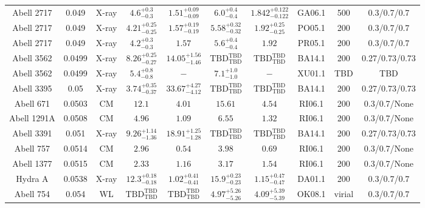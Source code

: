 \begin{table}
\begin{tabular}{cccccccccc}
Abell 2717 & 0.049 & X-ray & ${4.6}^{+0.3}_{-0.3}$ & ${1.51}^{+0.09}_{-0.09}$ & ${6.0}^{+0.4}_{-0.4}$ & ${1.842}^{+0.122}_{-0.122}$ & GA06.1 & 500 & 0.3/0.7/0.7 \\
Abell 2717 & 0.049 & X-ray & ${4.21}^{+0.25}_{-0.25}$ & ${1.57}^{+0.19}_{-0.19}$ & ${5.58}^{+0.32}_{-0.32}$ & ${1.92}^{+0.25}_{-0.25}$ & PO05.1 & 200 & 0.3/0.7/0.7 \\
Abell 2717 & 0.049 & X-ray & ${4.2}^{+0.3}_{-0.3}$ & ${1.57}^{}_{}$ & ${5.6}^{+0.4}_{-0.4}$ & ${1.92}^{}_{}$ & PR05.1 & 200 & 0.3/0.7/0.7 \\
Abell 3562 & 0.0499 & X-ray & ${8.26}^{+0.25}_{-0.27}$ & ${14.05}^{+1.56}_{-1.46}$ & ${\mathrm{TBD}}^{\mathrm{TBD}}_{\mathrm{TBD}}$ & ${\mathrm{TBD}}^{\mathrm{TBD}}_{\mathrm{TBD}}$ & BA14.1 & 200 & 0.27/0.73/0.73 \\
Abell 3562 & 0.0499 & X-ray & ${5.4}^{+0.8}_{-0.8}$ & ${-}^{}_{}$ & ${7.1}^{+1.0}_{-1.0}$ & ${-}^{}_{}$ & XU01.1 & TBD & TBD \\
Abell 3395 & 0.05 & X-ray & ${3.74}^{+0.35}_{-0.37}$ & ${33.67}^{+4.27}_{-4.12}$ & ${\mathrm{TBD}}^{\mathrm{TBD}}_{\mathrm{TBD}}$ & ${\mathrm{TBD}}^{\mathrm{TBD}}_{\mathrm{TBD}}$ & BA14.1 & 200 & 0.27/0.73/0.73 \\
Abell 671 & 0.0503 & CM & ${12.1}^{}_{}$ & ${4.01}^{}_{}$ & ${15.61}^{}_{}$ & ${4.54}^{}_{}$ & RI06.1 & 200 & 0.3/0.7/None \\
Abell 1291A & 0.0508 & CM & ${4.96}^{}_{}$ & ${1.09}^{}_{}$ & ${6.55}^{}_{}$ & ${1.32}^{}_{}$ & RI06.1 & 200 & 0.3/0.7/None \\
Abell 3391 & 0.051 & X-ray & ${9.26}^{+1.14}_{-1.36}$ & ${18.91}^{+1.25}_{-1.28}$ & ${\mathrm{TBD}}^{\mathrm{TBD}}_{\mathrm{TBD}}$ & ${\mathrm{TBD}}^{\mathrm{TBD}}_{\mathrm{TBD}}$ & BA14.1 & 200 & 0.27/0.73/0.73 \\
Abell 757 & 0.0514 & CM & ${2.96}^{}_{}$ & ${0.54}^{}_{}$ & ${3.98}^{}_{}$ & ${0.69}^{}_{}$ & RI06.1 & 200 & 0.3/0.7/None \\
Abell 1377 & 0.0515 & CM & ${2.33}^{}_{}$ & ${1.16}^{}_{}$ & ${3.17}^{}_{}$ & ${1.54}^{}_{}$ & RI06.1 & 200 & 0.3/0.7/None \\
Hydra A & 0.0538 & X-ray & ${12.3}^{+0.18}_{-0.18}$ & ${1.02}^{+0.41}_{-0.41}$ & ${15.9}^{+0.23}_{-0.23}$ & ${1.15}^{+0.47}_{-0.47}$ & DA01.1 & 200 & 0.3/0.7/0.7 \\
Abell 754 & 0.054 & WL & ${\mathrm{TBD}}^{\mathrm{TBD}}_{\mathrm{TBD}}$ & ${\mathrm{TBD}}^{\mathrm{TBD}}_{\mathrm{TBD}}$ & ${4.97}^{+5.26}_{-5.26}$ & ${4.09}^{+5.39}_{-5.39}$ & OK08.1 & virial & 0.3/0.7/0.7 \\

\end{tabular}
\end{table}

